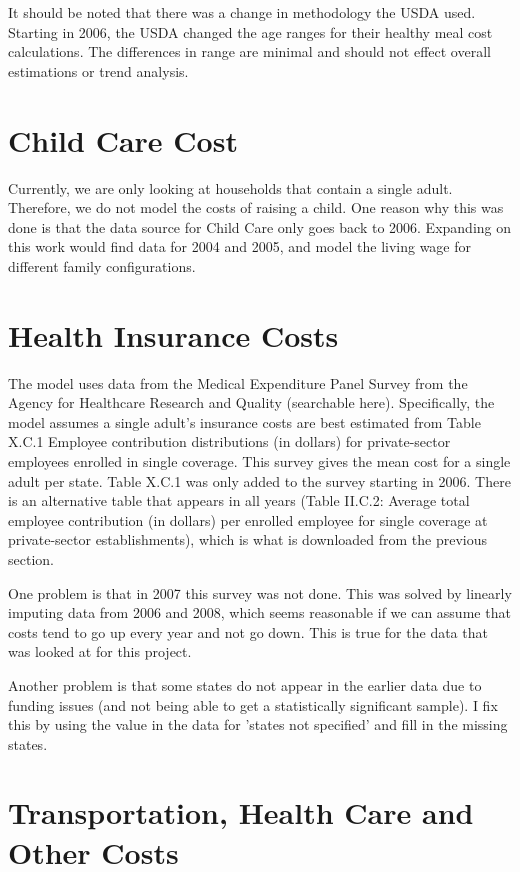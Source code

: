 It should be noted that there was a change in methodology the USDA used. Starting in 2006, the USDA changed the age ranges for their healthy meal cost calculations. The differences in range are minimal and should not effect overall estimations or trend analysis.

\section{Child Care Cost}

Currently, we are only looking at households that contain a single adult. Therefore, we do not model the costs of raising a child. One reason why this was done is that the data source for Child Care only goes back to 2006. Expanding on this work would find data for 2004 and 2005, and model the living wage for different family configurations.

\section{Health Insurance Costs}

The model uses data from the Medical Expenditure Panel Survey from the Agency for Healthcare Research and Quality (searchable here). Specifically, the model assumes a single adult's insurance costs are best estimated from Table X.C.1 Employee contribution distributions (in dollars) for private-sector employees enrolled in single coverage. This survey gives the mean cost for a single adult per state. Table X.C.1 was only added to the survey starting in 2006. There is an alternative table that appears in all years (Table II.C.2: Average total employee contribution (in dollars) per enrolled employee for single coverage at private-sector establishments), which is what is downloaded from the previous section.

One problem is that in 2007 this survey was not done. This was solved by linearly imputing data from 2006 and 2008, which seems reasonable if we can assume that costs tend to go up every year and not go down. This is true for the data that was looked at for this project.

Another problem is that some states do not appear in the earlier data due to funding issues (and not being able to get a statistically significant sample). I fix this by using the value in the data for 'states not specified' and fill in the missing states.


\section{Transportation, Health Care and Other Costs}

